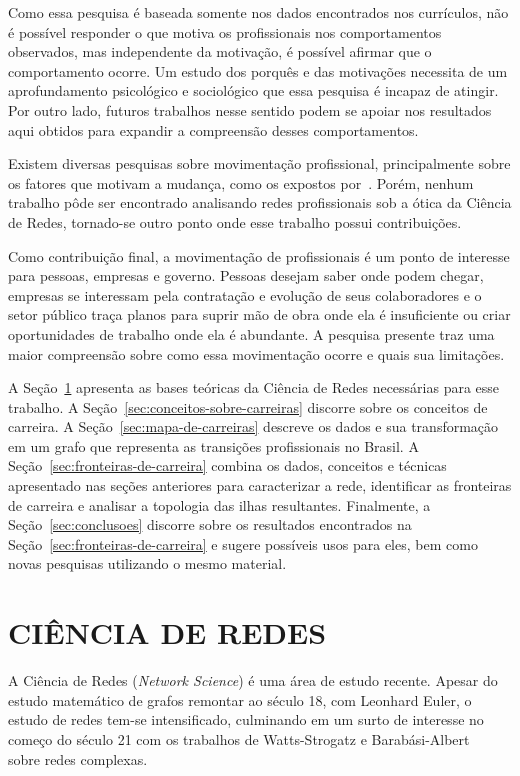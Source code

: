 \documentclass[12pt,a4paper]{article}
\begin{document}
Como essa pesquisa é baseada somente nos dados encontrados nos currículos, não é possível responder o que motiva os profissionais nos comportamentos observados, mas independente da motivação, é possível afirmar que o comportamento ocorre. Um estudo dos porquês e das motivações necessita de um aprofundamento psicológico e sociológico que essa pesquisa é incapaz de atingir. Por outro lado, futuros trabalhos nesse sentido podem se apoiar nos resultados aqui obtidos para expandir a compreensão desses comportamentos.

Existem diversas pesquisas sobre movimentação profissional, principalmente sobre os fatores que motivam a mudança, como os expostos por~. Porém, nenhum trabalho pôde ser encontrado analisando redes profissionais sob a ótica da Ciência de Redes, tornado-se outro ponto onde esse trabalho possui contribuições.

Como contribuição final, a movimentação de profissionais é um ponto de interesse para pessoas, empresas e governo. Pessoas desejam saber onde podem chegar, empresas se interessam pela contratação e evolução de seus colaboradores e o setor público traça planos para suprir mão de obra onde ela é insuficiente ou criar oportunidades de trabalho onde ela é abundante. A pesquisa presente traz uma maior compreensão sobre como essa movimentação ocorre e quais sua limitações.

A Seção~\ref{sec:ciencia-de-redes} apresenta as bases teóricas da Ciência de Redes necessárias para esse trabalho. A Seção~\ref{sec:conceitos-sobre-carreiras} discorre sobre os conceitos de carreira. A Seção~\ref{sec:mapa-de-carreiras} descreve os dados e sua transformação em um grafo que representa as transições profissionais no Brasil. A Seção~\ref{sec:fronteiras-de-carreira} combina os dados, conceitos e técnicas apresentado nas seções anteriores para caracterizar a rede, identificar as fronteiras de carreira e analisar a topologia das ilhas resultantes. Finalmente, a Seção~\ref{sec:conclusoes} discorre sobre os resultados encontrados na Seção~\ref{sec:fronteiras-de-carreira} e sugere possíveis usos para eles, bem como novas pesquisas utilizando o mesmo material.

\section{CIÊNCIA DE REDES} \label{sec:ciencia-de-redes}

A Ciência de Redes (\textit{Network Science}) é uma área de estudo recente. Apesar do estudo matemático de grafos remontar ao século 18, com Leonhard Euler, o estudo de redes tem-se intensificado, culminando em um surto de interesse no começo do século 21 com os trabalhos de Watts-Strogatz e Barabási-Albert~\cite{Watts1998-wt,Barabasi1999-sn} sobre redes complexas.
\end{document}
